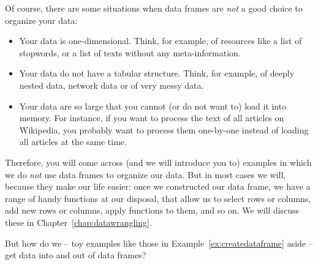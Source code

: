 Of course, there are some situations when data frames are \emph{not} a good choice to organize your data:
\begin{itemize}
\item Your data is one-dimensional. Think, for example, of resources like a list of stopwords, or a list of texts without any meta-information.
\item Your data do not have a tabular structure. Think, for example, of deeply nested data, network data or of very messy data.
\item Your data are so large that you cannot (or do not want to) load it into memory. For instance, if you want to process the text of all articles on Wikipedia, you probably want to process them one-by-one instead of loading all articles at the same time.
\end{itemize}



Therefore, you will come across (and we will introduce you to) examples in which we do \emph{not} use data frames to organize our data.
But in most cases we will, because they make our life easier:
once we constructed our data frame, we have a range of handy functions at our disposal, that allow us to select rows or columns, add new rows or columns, apply functions to them, and so on.
We will discuss these in Chapter~\ref{chap:datawrangling}.

But how do we -- toy examples like those in Example~\ref{ex:createdataframe} aside -- get data into and out of data frames?






